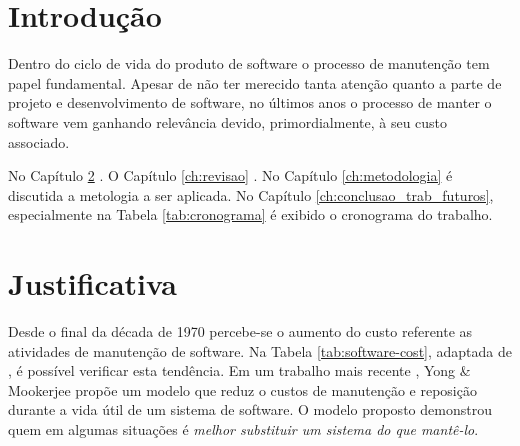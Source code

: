 \documentclass[msc,proposal,hidelot,hideabstract]{ppgccufmg} %
\begin{document}
\chapter{Introdução}
\label{ch:intro}
Dentro do ciclo de vida do produto de software o processo de manutenção tem
papel fundamental. Apesar de não ter merecido tanta atenção quanto a parte de
projeto e desenvolvimento de software, no últimos anos o processo de manter o
software vem ganhando relevância devido, primordialmente, à seu custo
associado.

No Capítulo \ref{ch:justificativa} . O Capítulo \ref{ch:revisao} . No
Capítulo \ref{ch:metodologia} é discutida a metologia a ser aplicada. No
Capítulo \ref{ch:conclusao_trab_futuros}, especialmente na Tabela \ref{tab:cronograma} é exibido o cronograma do trabalho.

\chapter{Justificativa}
\label{ch:justificativa}
Desde o final da década de 1970 percebe-se o aumento do custo referente as
atividades de  manutenção de software. Na
Tabela \ref{tab:software-cost}, adaptada de  \cite{koskinen2003software},  é possível verificar esta tendência. Em um trabalho mais
recente \cite{1423995}, Yong \& Mookerjee propõe um modelo que reduz o custos de
manutenção e reposição durante a vida útil de um sistema de software. O modelo
proposto demonstrou quem em algumas situações é \textit{melhor substituir um sistema do que mantê-lo}.
\end{document}
